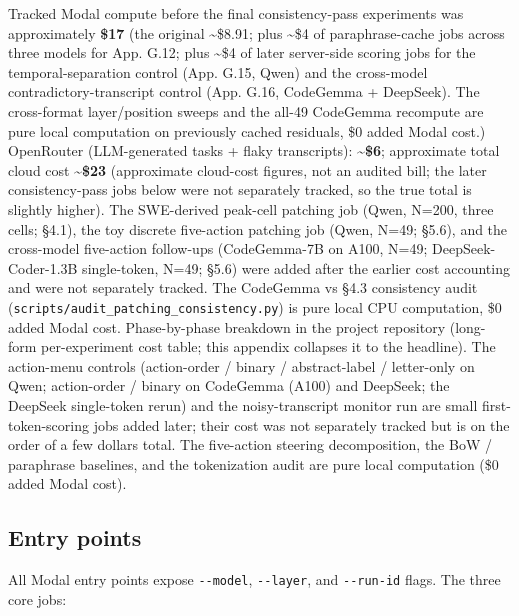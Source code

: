 \documentclass[
  11pt,
  a4paper]{article}
\begin{document}
Tracked Modal compute before the final consistency-pass experiments was
approximately \textbf{\$17} (the original \textasciitilde\$8.91; plus
\textasciitilde\$4 of paraphrase-cache jobs across three models for App.
G.12; plus \textasciitilde\$4 of later server-side scoring jobs for the
temporal-separation control (App. G.15, Qwen) and the cross-model
contradictory-transcript control (App. G.16, CodeGemma + DeepSeek). The
cross-format layer/position sweeps and the all-49 CodeGemma recompute
are pure local computation on previously cached residuals, \$0 added
Modal cost.) OpenRouter (LLM-generated tasks + flaky transcripts):
\textbf{\textasciitilde\$6}; approximate total cloud cost
\textbf{\textasciitilde\$23} (approximate cloud-cost figures, not an
audited bill; the later consistency-pass jobs below were not separately
tracked, so the true total is slightly higher). The SWE-derived
peak-cell patching job (Qwen, N=200, three cells; \S{}4.1), the toy
discrete five-action patching job (Qwen, N=49; \S{}5.6), and the
cross-model five-action follow-ups (CodeGemma-7B on A100, N=49;
DeepSeek-Coder-1.3B single-token, N=49; \S{}5.6) were added after the
earlier cost accounting and were not separately tracked. The CodeGemma
vs \S{}4.3 consistency audit
(\texttt{scripts/audit\_patching\_consistency.py}) is pure local CPU
computation, \$0 added Modal cost. Phase-by-phase breakdown in the
project repository (long-form per-experiment cost table; this appendix
collapses it to the headline). The action-menu controls (action-order /
binary / abstract-label / letter-only on Qwen; action-order / binary on
CodeGemma (A100) and DeepSeek; the DeepSeek single-token rerun) and the
noisy-transcript monitor run are small first-token-scoring jobs added
later; their cost was not separately tracked but is on the order of a
few dollars total. The five-action steering decomposition, the BoW /
paraphrase baselines, and the tokenization audit are pure local
computation (\$0 added Modal cost).

\subsection{Entry points}\label{entry-points}

All Modal entry points expose \texttt{-\/-model}, \texttt{-\/-layer},
and \texttt{-\/-run-id} flags. The three core jobs:
\end{document}
